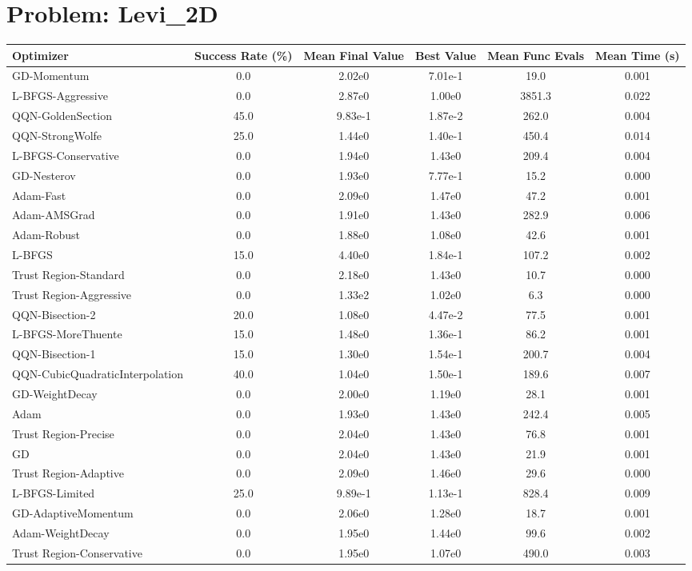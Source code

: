 \documentclass{article}
\begin{document}
\section{Problem: Levi\_2D}
\begin{longtable}{p{3cm}*{5}{c}}
\toprule
\textbf{Optimizer} & \textbf{Success Rate (\%)} & \textbf{Mean Final Value} & \textbf{Best Value} & \textbf{Mean Func Evals} & \textbf{Mean Time (s)} \\
\midrule
GD-Momentum & 0.0 & 2.02e0 & 7.01e-1 & 19.0 & 0.001 \\
L-BFGS-Aggressive & 0.0 & 2.87e0 & 1.00e0 & 3851.3 & 0.022 \\
QQN-GoldenSection & 45.0 & 9.83e-1 & 1.87e-2 & 262.0 & 0.004 \\
QQN-StrongWolfe & 25.0 & 1.44e0 & 1.40e-1 & 450.4 & 0.014 \\
L-BFGS-Conservative & 0.0 & 1.94e0 & 1.43e0 & 209.4 & 0.004 \\
GD-Nesterov & 0.0 & 1.93e0 & 7.77e-1 & 15.2 & 0.000 \\
Adam-Fast & 0.0 & 2.09e0 & 1.47e0 & 47.2 & 0.001 \\
Adam-AMSGrad & 0.0 & 1.91e0 & 1.43e0 & 282.9 & 0.006 \\
Adam-Robust & 0.0 & 1.88e0 & 1.08e0 & 42.6 & 0.001 \\
L-BFGS & 15.0 & 4.40e0 & 1.84e-1 & 107.2 & 0.002 \\
Trust Region-Standard & 0.0 & 2.18e0 & 1.43e0 & 10.7 & 0.000 \\
Trust Region-Aggressive & 0.0 & 1.33e2 & 1.02e0 & 6.3 & 0.000 \\
QQN-Bisection-2 & 20.0 & 1.08e0 & 4.47e-2 & 77.5 & 0.001 \\
L-BFGS-MoreThuente & 15.0 & 1.48e0 & 1.36e-1 & 86.2 & 0.001 \\
QQN-Bisection-1 & 15.0 & 1.30e0 & 1.54e-1 & 200.7 & 0.004 \\
QQN-CubicQuadraticInterpolation & 40.0 & 1.04e0 & 1.50e-1 & 189.6 & 0.007 \\
GD-WeightDecay & 0.0 & 2.00e0 & 1.19e0 & 28.1 & 0.001 \\
Adam & 0.0 & 1.93e0 & 1.43e0 & 242.4 & 0.005 \\
Trust Region-Precise & 0.0 & 2.04e0 & 1.43e0 & 76.8 & 0.001 \\
GD & 0.0 & 2.04e0 & 1.43e0 & 21.9 & 0.001 \\
Trust Region-Adaptive & 0.0 & 2.09e0 & 1.46e0 & 29.6 & 0.000 \\
L-BFGS-Limited & 25.0 & 9.89e-1 & 1.13e-1 & 828.4 & 0.009 \\
GD-AdaptiveMomentum & 0.0 & 2.06e0 & 1.28e0 & 18.7 & 0.001 \\
Adam-WeightDecay & 0.0 & 1.95e0 & 1.44e0 & 99.6 & 0.002 \\
Trust Region-Conservative & 0.0 & 1.95e0 & 1.07e0 & 490.0 & 0.003 \\
\bottomrule
\end{longtable}
\end{document}

